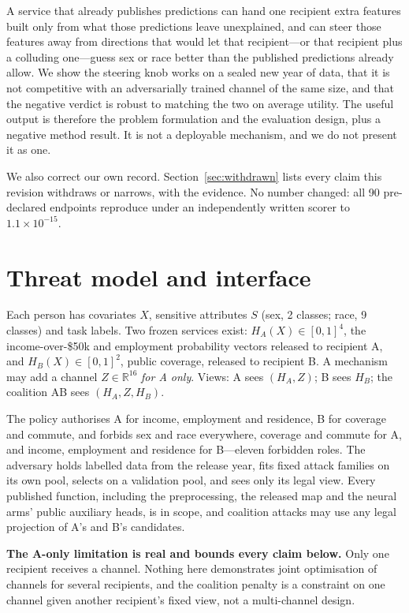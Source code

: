 \documentclass[10pt]{article}
\begin{document}
A service that already publishes predictions can hand one recipient extra features built only from
what those predictions leave unexplained, and can steer those features away from directions that
would let that recipient---or that recipient plus a colluding one---guess sex or race better than
the published predictions already allow. We show the steering knob works on a sealed new year of
data, that it is not competitive with an adversarially trained channel of the same size, and that
the negative verdict is robust to matching the two on average utility. The useful output is
therefore the problem formulation and the evaluation design, plus a negative method result. It is
not a deployable mechanism, and we do not present it as one.

We also correct our own record. Section~\ref{sec:withdrawn} lists every claim this revision
withdraws or narrows, with the evidence. No number changed: all 90 pre-declared endpoints reproduce
under an independently written scorer to $1.1\times10^{-15}$.

\section{Threat model and interface}
\label{sec:interface}

Each person has covariates $X$, sensitive attributes $S$ (sex, 2 classes; race, 9 classes) and task
labels. Two frozen services exist: $H_A(X)\in[0,1]^4$, the income-over-\$50k and employment
probability vectors released to recipient A, and $H_B(X)\in[0,1]^2$, public coverage, released to
recipient B. A mechanism may add a channel $Z\in\mathbb{R}^{16}$ \emph{for A only}. Views: A sees
$(H_A,Z)$; B sees $H_B$; the coalition AB sees $(H_A,Z,H_B)$.

The policy authorises A for income, employment and residence, B for coverage and commute, and
forbids sex and race everywhere, coverage and commute for A, and income, employment and residence
for B---eleven forbidden roles. The adversary holds labelled data from the release year, fits fixed
attack families on its own pool, selects on a validation pool, and sees only its legal view. Every
published function, including the preprocessing, the released map and the neural arms' public
auxiliary heads, is in scope, and coalition attacks may use any legal projection of A's and B's
candidates.

\textbf{The A-only limitation is real and bounds every claim below.} Only one recipient receives a
channel. Nothing here demonstrates joint optimisation of channels for several recipients, and the
coalition penalty is a constraint on one channel given another recipient's fixed view, not a
multi-channel design.
\end{document}
